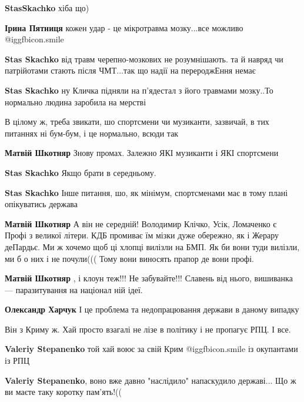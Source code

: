 \begin{itemize}
\begin{itemize}
\textbf{StasSkachko} хіба що)

\textbf{Ірина Пятниця} кожен удар - це мікротравма мозку...все можливо  @igg{fbicon.smile} 

\textbf{Stas Skachko} від травм черепно-мозкових не розумнішають. та й навряд чи патрійотами стають після ЧМТ...так що надії на перероджЕння немає

\textbf{Stas Skachko} ну Кличка підняли на п'ядестал з його травмами мозку..То нормально людина заробила на мерстві
\end{itemize} %


В цілому ж, треба звикати, шо спортсмени чи музиканти, зазвичай, в тих питаннях
ні бум-бум, і це нормально, всюди так

\begin{itemize} %
\textbf{Матвій Шкотняр} Знову промах. Залежно ЯКІ музиканти і ЯКІ спортсмени

\textbf{Stas Skachko} Якщо брати в середньому.

\textbf{Stas Skachko} Інше питання, шо, як мінімум, спортсменами має в тому плані опікуватись держава

\textbf{Матвій Шкотняр} А він не середній! Володимир Клічко, Усік, Ломаченко є Профі з великої літери. КДБ промиває їм мізки дуже обережно, як і Жерару деПардьє. Ми ж хочемо щоб ці хлопці вилізли на БМП. Як би вони туди вилізли, ми б о них і не почули((( Тому вони виносять прапор де вони профі.

\textbf{Матвій Шкотняр} , і клоун теж!!! Не забувайте!!! Славень від нього, вишиванка — паразитування на націонал ній ідеї.

\textbf{Олександр Харчук} І це проблема та недопрацювання держави в даному випадку
\end{itemize} %

Він з Криму ж. Хай просто взагалі не лізе в політику і не пропагує РПЦ. І все.

\begin{itemize} %
\textbf{Valeriy Stepanenko} той хай воює за свій Крим  @igg{fbicon.smile}  із окупантами із РПЦ

\textbf{Valeriy Stepanenko}, воно вже давно "наслідило" напаскудило державі... Що ж ви маєте таку коротку пам'ять!((
\end{itemize} %


\end{itemize}
